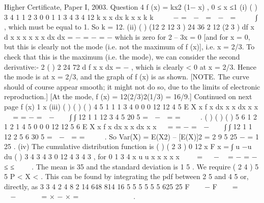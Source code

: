 \documentclass[a4paper,12pt]{article}
\begin{document}
Higher Certificate, Paper I, 2003. Question 4
f (x) = kx2 (1− x) , 0 ≤ x ≤1
(i) ( )
3 4 1 1 2 3
0
0
1 1
3 4 3 4 12
k x x dx k x x k k
    − =  −  =  −  =     ∫ ,
which must be equal to 1. So k = 12.
(ii) ( ) (12 2 12 3 ) 24 36 2 12 (2 3 )
df x d x x x x x x
dx dx
= − = − = −
which is zero for 2 – 3x = 0 [and for x = 0, but this is clearly not the mode (i.e.
not the maximum of f (x)], i.e. x = 2/3. To check that this is the maximum (i.e.
the mode), we can consider the second derivative:-
2 ( )
2 24 72
d f x
x
dx
= − , which is clearly < 0 at x = 2/3.
Hence the mode is at x = 2/3, and the graph of f (x) is as shown. [NOTE. The
curve should of course appear smooth; it might not do so, due to the limits of
electronic reproduction.]
[At the mode, f (x) = 12(2/3)2(1/3) = 16/9.]
Continued on next page
f (x)
1 x
(iii) ( ) ( ) ( )
4 5 1 1 1 3 4
0 0
0
12 12
4 5
E X x f x dx x x dx x x
 
= = − =  − 
  ∫ ∫
12 1 1 12 3
4 5 20 5
=  −  = =  
 
.
( ) ( ) ( )
5 6 1 2 1 2 1 4 5
0 0
0
12 12
5 6
E X x f x dx x x dx x x
 
= = − =  − 
  ∫ ∫
12 1 1 12 2
5 6 30 5
=  −  = =  
 
.
So Var(X) = E(X2) – [E(X)]2 = 2 9
5 25
− = 1
25
.
(iv) The cumulative distribution function is ( ) ( 2 3 )
0
12 x F x = ∫ u −u du
( )
3 4
3 4 3
0
12 4 3 4 3 , for 0 1
3 4
x u u x x x x x
  
=   −  = − = − ≤ ≤
  
.
The mean is 35
and the standard deviation is 1
5 . We require ( 2 4 )
5 5 P < X < .
This can be found by integrating the pdf between 2
5 and 4
5 or, directly, as
3 3 4 2 4 8 2 14 648 814 16
5 5 5 5 5 5 625 25
F   − F   =     −    = × − × =
           
.
\end{document}

